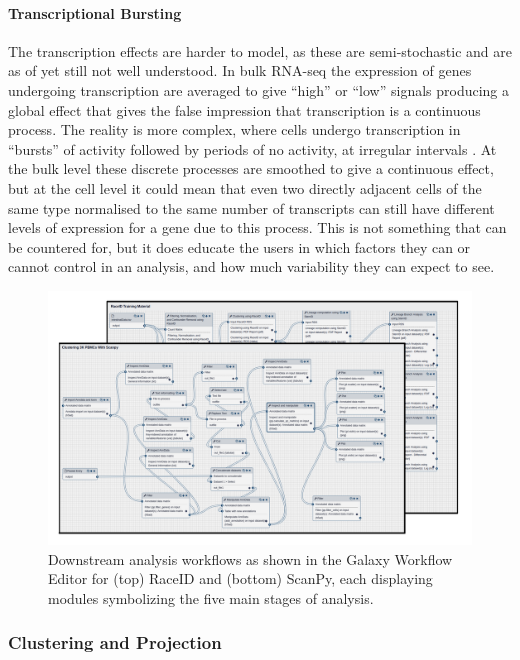 \documentclass[a4paper,num-refs]{oup-contemporary}
\begin{document}
\paragraph{Transcriptional Bursting}
The transcription effects are harder to model, as these are semi-stochastic and are as of yet still not well understood. In bulk RNA-seq the expression of genes undergoing transcription are averaged to give ``high'' or ``low'' signals producing a global effect that gives the false impression that transcription is a continuous process. The reality is more complex, where cells undergo transcription in ``bursts'' of activity followed by periods of no activity, at irregular intervals \citep{raj2008nature}. At the bulk level these discrete processes are smoothed to give a continuous effect, but at the cell level it could mean that even two directly adjacent cells of the same type normalised to the same number of transcripts can still have different levels of expression for a gene due to this process. This is not something that can be countered for, but it does educate the users in which factors they can or cannot control in an analysis, and how much variability they can expect to see.

\begin{figure}[bt!]
\centering
\includegraphics[width=\linewidth]{Images/wf_downstream.png}
\caption{Downstream analysis workflows as shown in the Galaxy Workflow Editor for (top) RaceID and (bottom) ScanPy, each displaying modules symbolizing the five main stages of analysis.}\label{fig:downstream}
\end{figure}

\subsubsection{Clustering and Projection}
\end{document}
